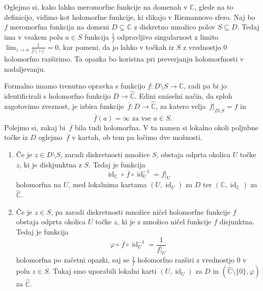 \documentclass[mat1]{fmfdelo}
\numberwithin{equation}{section}
\newcommand{\C}{\mathbb C}
\newcommand{\RS}{\widehat{\C}}
\newcommand{\inv}{^{-1}}
\newcommand{\olsi}[1]{\,\overline{\!{#1}}} %
\DeclareMathOperator{\id}{id}
\theoremstyle{definition}
\begin{document}

\begin{zgled*}
    \label{meromorfne so holomorfne v R.sfero}
    Oglejmo si, kako lahko meromorfne funkcije na domenah v $\C$, glede na to definicijo, vidimo kot holomorfne funkcije, ki slikajo v Riemannovo sfero. Naj bo $f$ meromorfna funkcija na domeni $D \subseteq \C$ z diskretno množico polov $S \subseteq D$. Tedaj ima v vsakem polu $a \in S$ funkcija $\frac1f$ odpravljivo singularnost z limito $\lim_{z \to a} \frac{1}{f(z)} = 0$, kar pomeni, da jo lahko v točkah iz $S$ z vrednostjo $0$ holomorfno razširimo. Ta opazka bo koristna pri preverjanju holomorfnosti v nadaljevanju. 
    
    Formalno imamo trenutno opravka s funkcijo $f: D\setminus S \to \C$, radi pa bi jo identificirali s holomorfno funkcijo $D \to \RS$. Edini smiselni način, da sploh zagotovimo zveznost, je izbira funkcije $\olsi{f} : D \to \RS$, za katero velja $\olsi{f}|_{D\setminus S} = f$ in 
    \[
        \olsi{f}(a) = \infty \text{ za vse } a \in S.  
    \]
    Polejmo si, zakaj bi $\olsi{f}$ bila tudi holomorfna. V ta namen si lokalno okoli poljubne točke iz $D$ oglejmo $\olsi{f}$ v kartah, ob tem pa ločimo dve možnosti.
    \begin{enumerate}
        \item Če je $z \in D\setminus S$, zaradi diskretnosti množice $S$, obstaja odprta okolica $U$ točke $z$, ki je diskjunktna z $S$. Tedaj je funkcija
        \[
            \id_\C \circ \olsi{f} \circ \id_U\inv = f|_U  
        \]
        holomorfna na $U$, med lokalnima kartama $(U, \id_U)$ za $D$ ter $(\C, \id_\C)$ za $\RS$.
        
        \item Če je $z \in S$, pa zaradi diskretnosti množice ničel holomorfne funkcije $f$ obstaja odprta okolica $U$ točke $z$, ki je z množico ničel funkcije $f$ disjunktna. Tedaj je funkcija
        \[
            \varphi \circ \olsi{f} \circ \id_U\inv = \frac{1}{f|_U}
        \]
        holomorfna po začetni opazki, saj se $\frac{1}{f}$ holomorfno razširi z vrednostjo $0$ v polu $z \in S$. Tukaj smo uporabili lokalni karti $(U, \id_U)$ za $D$ in $(\RS \setminus \{0\}, \varphi)$ za $\RS$.
    \end{enumerate}



\end{zgled*}
\end{document}
